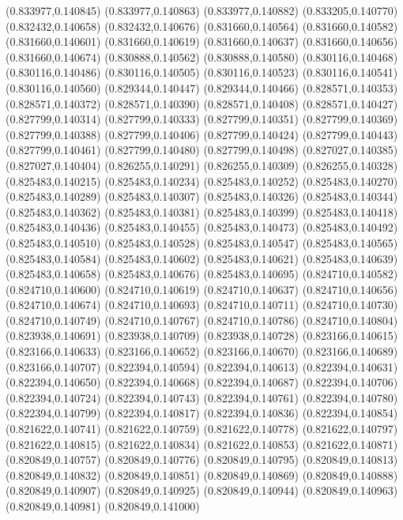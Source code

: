 (0.833977,0.140845)
(0.833977,0.140863)
(0.833977,0.140882)
(0.833205,0.140770)
(0.832432,0.140658)
(0.832432,0.140676)
(0.831660,0.140564)
(0.831660,0.140582)
(0.831660,0.140601)
(0.831660,0.140619)
(0.831660,0.140637)
(0.831660,0.140656)
(0.831660,0.140674)
(0.830888,0.140562)
(0.830888,0.140580)
(0.830116,0.140468)
(0.830116,0.140486)
(0.830116,0.140505)
(0.830116,0.140523)
(0.830116,0.140541)
(0.830116,0.140560)
(0.829344,0.140447)
(0.829344,0.140466)
(0.828571,0.140353)
(0.828571,0.140372)
(0.828571,0.140390)
(0.828571,0.140408)
(0.828571,0.140427)
(0.827799,0.140314)
(0.827799,0.140333)
(0.827799,0.140351)
(0.827799,0.140369)
(0.827799,0.140388)
(0.827799,0.140406)
(0.827799,0.140424)
(0.827799,0.140443)
(0.827799,0.140461)
(0.827799,0.140480)
(0.827799,0.140498)
(0.827027,0.140385)
(0.827027,0.140404)
(0.826255,0.140291)
(0.826255,0.140309)
(0.826255,0.140328)
(0.825483,0.140215)
(0.825483,0.140234)
(0.825483,0.140252)
(0.825483,0.140270)
(0.825483,0.140289)
(0.825483,0.140307)
(0.825483,0.140326)
(0.825483,0.140344)
(0.825483,0.140362)
(0.825483,0.140381)
(0.825483,0.140399)
(0.825483,0.140418)
(0.825483,0.140436)
(0.825483,0.140455)
(0.825483,0.140473)
(0.825483,0.140492)
(0.825483,0.140510)
(0.825483,0.140528)
(0.825483,0.140547)
(0.825483,0.140565)
(0.825483,0.140584)
(0.825483,0.140602)
(0.825483,0.140621)
(0.825483,0.140639)
(0.825483,0.140658)
(0.825483,0.140676)
(0.825483,0.140695)
(0.824710,0.140582)
(0.824710,0.140600)
(0.824710,0.140619)
(0.824710,0.140637)
(0.824710,0.140656)
(0.824710,0.140674)
(0.824710,0.140693)
(0.824710,0.140711)
(0.824710,0.140730)
(0.824710,0.140749)
(0.824710,0.140767)
(0.824710,0.140786)
(0.824710,0.140804)
(0.823938,0.140691)
(0.823938,0.140709)
(0.823938,0.140728)
(0.823166,0.140615)
(0.823166,0.140633)
(0.823166,0.140652)
(0.823166,0.140670)
(0.823166,0.140689)
(0.823166,0.140707)
(0.822394,0.140594)
(0.822394,0.140613)
(0.822394,0.140631)
(0.822394,0.140650)
(0.822394,0.140668)
(0.822394,0.140687)
(0.822394,0.140706)
(0.822394,0.140724)
(0.822394,0.140743)
(0.822394,0.140761)
(0.822394,0.140780)
(0.822394,0.140799)
(0.822394,0.140817)
(0.822394,0.140836)
(0.822394,0.140854)
(0.821622,0.140741)
(0.821622,0.140759)
(0.821622,0.140778)
(0.821622,0.140797)
(0.821622,0.140815)
(0.821622,0.140834)
(0.821622,0.140853)
(0.821622,0.140871)
(0.820849,0.140757)
(0.820849,0.140776)
(0.820849,0.140795)
(0.820849,0.140813)
(0.820849,0.140832)
(0.820849,0.140851)
(0.820849,0.140869)
(0.820849,0.140888)
(0.820849,0.140907)
(0.820849,0.140925)
(0.820849,0.140944)
(0.820849,0.140963)
(0.820849,0.140981)
(0.820849,0.141000)
